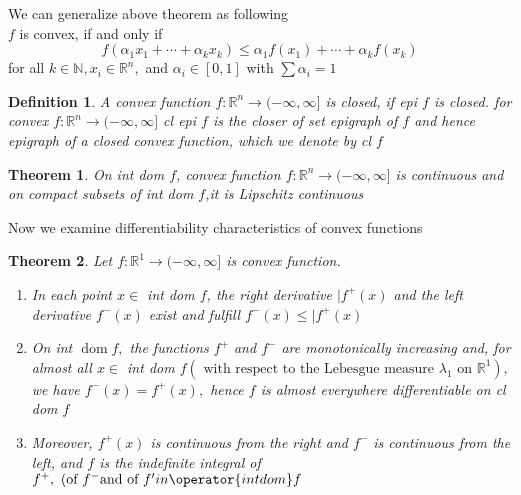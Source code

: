 \documentclass[oneside]{book}
\newtheorem{theorem}{Theorem}[section]
\newtheorem{mydef}{Definition}
\begin{document}
We can  generalize above theorem as following \\
$f$ is convex, if and only if
\begin{equation}
\label{eq41}
f\left(\alpha_{1} x_{1}+\cdots+\alpha_{k} x_{k}\right) \leq \alpha_{1} f\left(x_{1}\right)+\cdots+\alpha_{k} f\left(x_{k}\right)
\end{equation}
for all $k \in \mathbb{N}, x_{i} \in \mathbb{R}^{n},$ and $\alpha_{i} \in[0,1]$ with $\sum \alpha_{i}=1$



\begin{mydef}
 A convex function $f: \mathbb{R}^{n} \rightarrow(-\infty, \infty]$ is closed, if epi $f$ is closed.
for convex  $f: \mathbb{R}^{n} \rightarrow(-\infty, \infty]$   cl epi $f$ is the closer of set epigraph of $f$ and hence epigraph of a closed convex function, which we denote by cl $f$
\end{mydef}

\begin{theorem}	

 On int dom $f$, convex function $f: \mathbb{R}^{n} \rightarrow(-\infty, \infty]$ is continuous and on compact subsets of int dom $f$,it is Lipschitz continuous 	

\end{theorem}	
\newpage	
Now we examine differentiability characteristics of convex functions	
\begin{theorem}	

 Let $f: \mathbb{R}^{1} \rightarrow(-\infty, \infty]$ is convex function.	
\begin{enumerate}	
    \item 	
 In each point $x \in$ int dom $f$, the right derivative $| f^{+}(x)$ and the left derivative $f^{-}(x)$ exist and fulfill $f^{-}(x) \leq | f^{+}(x)$	
\\	
\item	
 On int $\operatorname{dom} f,$ the functions $f^{+}$ and $f^{-}$ are monotonically increasing and, for almost all	
$x \in$ int dom $f\left(\text { with respect to the Lebesgue measure } \lambda_{1} \text { on } \mathbb{R}^{1}\right),$ we have $f^{-}(x)=f^{+}(x),$ hence $f$ is almost everywhere differentiable on cl dom $f$	
\\	
\item	
 Moreover, $f^{+}(x)$	
is continuous from the right and $f^{-}$ is continuous from the left, and $f$ is the indefinite integral of $ f^{+}, \text { (of } f^{-} \text {and of } f^{\prime} in \operator {int dom} f$	
\end{enumerate}	






\end{theorem}
\end{document}
